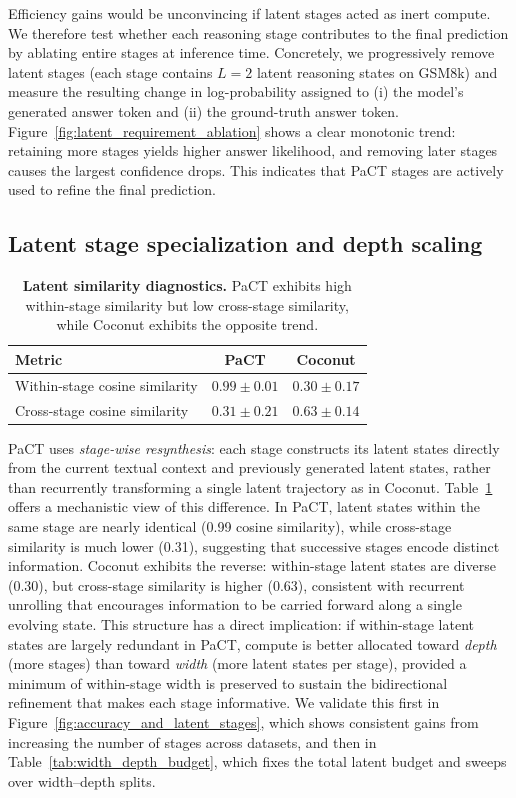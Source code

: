 Efficiency gains would be unconvincing if latent stages acted as inert compute. We therefore test whether each
reasoning stage contributes to the final prediction by ablating entire stages at inference time. Concretely, we
progressively remove latent stages (each stage contains $L{=}2$ latent reasoning states on GSM8k) and measure the
resulting change in log-probability assigned to (i) the model’s generated answer token and (ii) the ground-truth
answer token.
Figure~\ref{fig:latent_requirement_ablation}
shows a clear monotonic trend: retaining more stages yields higher answer likelihood, and removing later stages causes
the largest confidence drops. This indicates that PaCT stages are actively used to refine the final prediction.

\subsection{Latent stage specialization and depth scaling}
\label{sec:latent_content}

\begin{table}[t]
\centering
\small
\caption{\textbf{Latent similarity diagnostics.} PaCT exhibits high within-stage similarity but low cross-stage similarity,
while Coconut exhibits the opposite trend.}
\label{tab:latent_similarity}
\begin{tabular}{lcc}
\toprule
Metric & PaCT & Coconut \\
\midrule
Within-stage cosine similarity & $0.99 \pm 0.01$ & $0.30 \pm 0.17$ \\
Cross-stage cosine similarity  & $0.31 \pm 0.21$ & $0.63 \pm 0.14$ \\
\bottomrule
\end{tabular}
\vspace{-6mm}
\end{table}

PaCT uses \emph{stage-wise resynthesis}: each stage constructs its latent states directly from the current textual
context and previously generated latent states, rather than recurrently transforming a single latent trajectory as in Coconut. Table~\ref{tab:latent_similarity}
offers a mechanistic view of this difference. In PaCT, latent states within the same stage are nearly identical (0.99
cosine similarity), while cross-stage similarity is much lower (0.31), suggesting that successive stages encode distinct
information. Coconut exhibits the reverse: within-stage latent states are diverse (0.30), but cross-stage similarity is
higher (0.63), consistent with recurrent unrolling that encourages information to be carried forward along a single evolving state. This structure has a direct implication: if within-stage latent states are largely redundant in PaCT, compute is better
allocated toward \emph{depth} (more stages) than toward \emph{width} (more latent states per stage), provided a
minimum of within-stage width is preserved to sustain the bidirectional refinement that makes each stage informative.
We validate this first in Figure~\ref{fig:accuracy_and_latent_stages}, which shows consistent gains from increasing
the number of stages across datasets, and then in Table~\ref{tab:width_depth_budget}, which fixes the total latent
budget and sweeps over width--depth splits.

